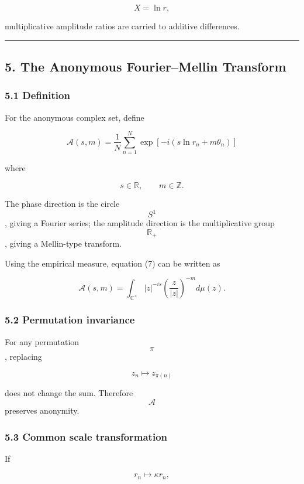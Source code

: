 \documentclass[
  a4paper,
]{article}
\begin{document}
\[
X=\ln r,
\]

multiplicative amplitude ratios are carried to additive differences.

\begin{center}\rule{0.5\linewidth}{0.5pt}\end{center}

\subsection{5. The Anonymous Fourier--Mellin
Transform}\label{the-anonymous-fouriermellin-transform}

\subsubsection{5.1 Definition}\label{definition}

For the anonymous complex set, define

\[
\boxed{
\mathcal A(s,m)
=
\frac1N
\sum_{n=1}^{N}
\exp
\left[
-i
\left(
s\ln r_n
+
m\theta_n
\right)
\right]
}
\tag{7}
\]

where

\[
s\in\mathbb R,
\qquad
m\in\mathbb Z.
\]

The phase direction is the circle \[S^1\], giving a Fourier series; the
amplitude direction is the multiplicative group \[\mathbb R_+\], giving
a Mellin-type transform.

Using the empirical measure, equation (7) can be written as

\[
\mathcal A(s,m)
=
\int_{\mathbb C^\times}
|z|^{-is}
\left(
\frac{z}{|z|}
\right)^{-m}
d\mu(z).
\tag{8}
\]

\subsubsection{5.2 Permutation invariance}\label{permutation-invariance}

For any permutation \[\pi\], replacing

\[
z_n\mapsto z_{\pi(n)}
\]

does not change the sum. Therefore \[\mathcal A\] preserves anonymity.

\subsubsection{5.3 Common scale
transformation}\label{common-scale-transformation}

If

\[
r_n
\mapsto
\kappa r_n,
\]
\end{document}
